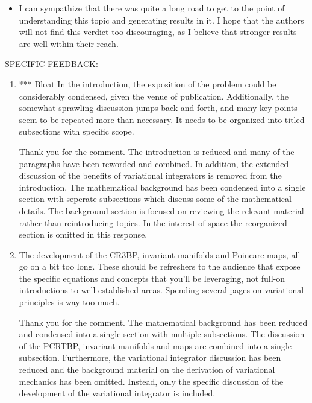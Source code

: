 \documentclass[11pt]{article}
\begin{document}
\begin{itemize}
\item 
    \begin{itshape}
I can sympathize that there was quite a long road to get to the point of understanding this topic and generating results in it. I hope that the authors will not find this verdict too discouraging, as I believe that stronger results are well within their reach.
\end{itshape}
\end{itemize}

SPECIFIC FEEDBACK:
\begin{enumerate}
    \item
    \begin{itshape}
*** Bloat
In the introduction, the exposition of the problem could be considerably condensed, given the venue of publication. Additionally, the somewhat sprawling discussion jumps back and forth, and many key points seem to be repeated more than necessary.  It needs to be organized into titled subsections with specific scope.
\end{itshape}

Thank you for the comment.
The introduction is reduced and many of the paragraphs have been reworded and combined. 
In addition, the extended discussion of the benefits of variational integrators is removed from the introduction.
The mathematical background has been condensed into a single section with seperate subsections which discuss some of the mathematical details.
The background section is focused on reviewing the relevant material rather than reintroducing topics.
In the interest of space the reorganized section is omitted in this response.

\item
    \begin{itshape}
The development of the CR3BP, invariant manifolds and Poincare maps, all go on a bit too long. These should be refreshers to the audience that expose the specific equations and concepts that you'll be leveraging, not full-on introductions to well-established areas.  Spending several pages on variational principles is way too much.
\end{itshape}

Thank you for the comment.
The mathematical background has been reduced and condensed into a single section with multiple subsections.
The discussion of the PCRTBP, invariant manifolds and \Poincare maps are combined into a single subsection.
Furthermore, the variational integrator discussion has been reduced and the background material on the derivation of variational mechanics has been omitted.
Instead, only the specific discussion of the development of the variational integrator is included. 


\end{enumerate}
\end{document}
